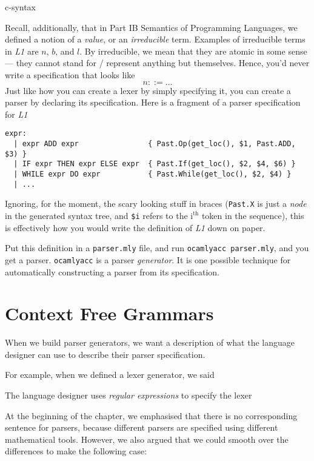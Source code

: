 \begin{center}
    {c-syntax}
\end{center}

Recall, additionally, that in \textsf{Part IB Semantics of Programming Languages}, we defined a notion of a \textit{value}, or an \textit{irreducible} term. Examples of irreducible terms in \textit{L1} are $n$, $b$, and $l$. By irreducible, we mean that they are atomic in some sense --- they cannot stand for / represent anything but themselves. Hence, you'd never write a specification that looks like
\[ n ::= \ldots \]
Just like how you can create a lexer by simply specifying it, you can create a parser by declaring its specification. Here is a fragment of a parser specification for \textit{L1}

\begin{verbatim}
expr:
  | expr ADD expr                { Past.Op(get_loc(), $1, Past.ADD, $3) }
  | IF expr THEN expr ELSE expr  { Past.If(get_loc(), $2, $4, $6) }
  | WHILE expr DO expr           { Past.While(get_loc(), $2, $4) }
  | ...
\end{verbatim}

Ignoring, for the moment, the scary looking stuff in braces (\texttt{Past.X} is just a \textit{node} in the generated syntax tree, and \texttt{\$i} refers to the $\text{i}^\text{th}$ token in the sequence), this is effectively how you would write the definition of \textit{L1} down on paper. 

Put this definition in a \texttt{parser.mly} file, and run \texttt{ocamlyacc parser.mly}, and you get a parser. \texttt{ocamlyacc} is a parser \textit{generator}. It is one possible technique for automatically constructing a parser from its specification.

\section{Context Free Grammars}\label{section:context-free-grammars}
When we build parser generators, we want a description of what the language designer can use to describe their parser specification. 

For example, when we defined a lexer generator, we said

\begin{center}
    The language designer uses \textit{regular expressions} to specify the lexer
\end{center}

At the beginning of the chapter, we emphasised that there is no corresponding sentence for parsers, because different parsers are specified using different mathematical tools. However, we also argued that we could smooth over the differences to make the following case:

